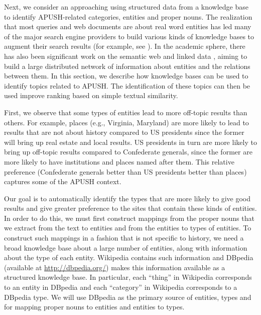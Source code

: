 \documentclass[pdfpagelabels=false,plainpages=true]{acm_proc_article-sp}
\begin{document}
Next, we consider an approaching using
structured data from a knowledge base to identify APUSH-related categories,
entities and proper nouns. The realization that most queries and web documents
are about real word entities 
has led many of the major search engine providers to build various kinds of knowledge
bases to augment their search results (for example, see \cite{googlekg}). In the
academic sphere, there has also been significant work on the semantic
web \cite{berners2001semantic} and linked data \cite{bizer2008linked}, aiming to build a
large distributed network of information about entities and the relations
between them. In this section, we describe how knowledge bases can be
used to identify topics related to APUSH. The identification of these topics can
then be used improve ranking based on simple textual similarity.   

First, we observe that some types of entities lead to more off-topic results than
others. For example, places (e.g., Virginia, Maryland) are more likely to lead
to results that are not about history compared to US presidents since the former
will bring up real estate and local results. US presidents in turn are more
likely to bring up off-topic results compared to Confederate generals, since the
former are more likely to have institutions and places named after them. This
relative preference (Confederate generals better than US presidents better than
places) captures some of the APUSH context. 

Our goal is to automatically identify the types that are more likely to give
good results and give greater preference to the sites that contain these kinds
of entities. In order to do this, we must first construct mappings from the proper nouns that
we extract from the text to entities and from the entities to types of
entities. To construct such mappings in a fashion that is not specific to history, we need a
broad knowledge base about a large number of entities, along with information
about the type of each entity. Wikipedia contains such information and DBpedia
(available at \url{http://dbpedia.org/}) makes this information available as a
structured knowledge base. In particular, each ``thing'' in Wikipedia
corresponds to an entity in DBpedia and each ``category'' in Wikipedia
corresponds to a DBpedia type. We will use DBpedia as the primary source of
entities, types and for mapping proper nouns to entities and entities to types. 
\end{document}
